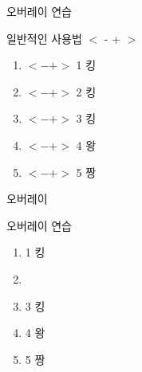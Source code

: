 \documentclass[10pt,xcolor=pdftex,dvipsnames,table,handout]{beamer}
\begin{document}
		\begin{frame}[t]{오버레이 연습 }

			\begin{block} {일반적인 사용법 $<$ - + $>$}
			\begin{enumerate}
			\item <-+> $<-+>$ 1 킹
			\item <-+> $<-+>$ 2 킹
			\item <-+> $<-+>$ 3 킹
			\item <-+> $<-+>$ 4 왕
			\item <-+> $<-+>$ 5 짱
			\end{enumerate}
			\end{block}

		\end{frame}




		\begin{frame}[t]{오버레이}

			\begin{block} {오버레이 연습}
			\begin{enumerate}
			\item <1-6> 1 킹
			\item <2-6> 
			\item <3-6> 3 킹
			\item <4-6> 4 왕
			\item <5-6> 5 짱
			
			\end{enumerate}
			\end{block}

		\end{frame}




\end{document}
